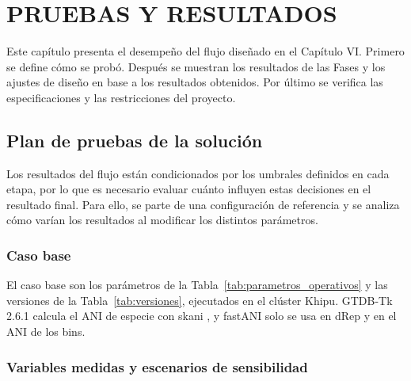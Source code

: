 \chapter{PRUEBAS Y RESULTADOS}


Este capítulo presenta el desempeño del flujo diseñado en el Capítulo VI. Primero se
define cómo se probó. Después se muestran los resultados de las Fases  y los
ajustes de diseño en base a los resultados obtenidos. Por último se verifica las
especificaciones y las restricciones del proyecto.

\section{Plan de pruebas de la solución}

Los resultados del flujo están condicionados por los umbrales definidos en cada
etapa, por lo que es necesario evaluar cuánto influyen estas decisiones en el
resultado final. Para ello, se parte de una configuración de referencia y se
analiza cómo varían los resultados al modificar los distintos parámetros.


\subsection{Caso base}

El caso base son los parámetros de la Tabla~\ref{tab:parametros_operativos} y
las versiones de la Tabla~\ref{tab:versiones}, ejecutados en el clúster Khipu.
GTDB-Tk 2.6.1 calcula el ANI de especie con skani \cite{shaw2023skani}, y
fastANI solo se usa en dRep y en el ANI de los bins.

\subsection{Variables medidas y escenarios de sensibilidad}

